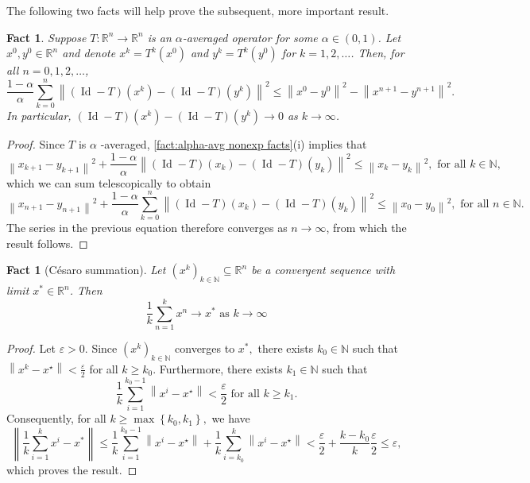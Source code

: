 \documentclass[smallextended,numbook,nospthms]{svjour3}
\theoremstyle{plain}
\newtheorem{fact}[theorem]{Fact}
\theoremstyle{definition}
\def\RR{\mathds R}
\def\NN{\mathds N}
\DeclareMathOperator{\Id}{Id}
\begin{document}
The following two facts will help prove the subsequent, more important result.
\begin{fact}\label{fact:alpha-avg lemma}
Suppose $T: \RR^n \rightarrow \RR^n$ is an $\alpha$-averaged operator for some $\alpha \in (0,1)$. Let $x^{0}, y^{0} \in \RR^n$ and denote $x^{k}=T^{k}\left(x^{0}\right)$ and $y^{k}=T^{k}\left(y^{0}\right)$ for $k=1,2, \ldots$. Then, for all $n=0,1,2, \ldots$, 
$$
\frac{1-\alpha}{\alpha} \sum_{k=0}^{n}\left\|(\operatorname{Id}-T)\left(x^{k}\right)-(\operatorname{Id}-T)\left(y^{k}\right)\right\|^{2} \leq\left\|x^{0}-y^{0}\right\|^{2}-\left\|x^{n+1}-y^{n+1}\right\|^{2}. 
$$
In particular, $(\Id-T)\left(x^{k}\right)-(\Id-T)\left(y^{k}\right) \rightarrow 0$ as $k \rightarrow \infty$.
\end{fact}
\begin{proof}
Since $T$ is $\alpha$ -averaged, \cref{fact:alpha-avg nonexp facts}(i) implies that
$$
\left\|x_{k+1}-y_{k+1}\right\|^{2}+\frac{1-\alpha}{\alpha}\left\|(\operatorname{Id}-T)\left(x_{k}\right)-(\Id-T)\left(y_{k}\right)\right\|^{2} \leq\left\|x_{k}-y_{k}\right\|^{2}, \text{ for all } k \in \NN,
$$
which we can sum telescopically to obtain
$$
\left\|x_{n+1}-y_{n+1}\right\|^{2}+\frac{1-\alpha}{\alpha} \sum_{k=0}^{n}\left\|(\operatorname{Id}-T)\left(x_{k}\right)-(\operatorname{Id}-T)\left(y_{k}\right)\right\|^{2} \leq\left\|x_{0}-y_{0}\right\|^{2}, \text{ for all } n \in \NN.
$$
The series in the previous equation therefore converges as $n \rightarrow \infty$, from which the result follows.
\end{proof}

\begin{fact}[Césaro summation]\label{fact:cesaro sum}
	Let $\left(x^{k}\right)_{k \in \NN} \subseteq \RR^n$ be a convergent sequence with limit $x^{*} \in \RR^n$. Then
	$$
	\frac{1}{k} \sum_{n=1}^{k} x^{n} \rightarrow x^* \text { as } k \rightarrow \infty
	$$
\end{fact}
\begin{proof}
	Let $\varepsilon>0$. Since $\left(x^{k}\right)_{k \in \NN}$ converges to $x^{*},$ there exists $k_{0} \in \NN$ such that $\left\|x^{k}-x^{\star}\right\|<\frac{\varepsilon}{2}$ for all $k \geq k_{0}$. Furthermore, there exists $k_{1} \in \NN$ such that
	$$
	\frac{1}{k} \sum_{i=1}^{k_{0}-1}\left\|x^{i}-x^{\star}\right\|<\frac{\varepsilon}{2} \text { for all } k \geq k_{1}.
	$$
	Consequently, for all $k \geq \max \left\{k_{0}, k_{1}\right\},$ we have
	$$
	\left\|\frac{1}{k} \sum_{i=1}^{k} x^{i}-x^{*}\right\| \leq \frac{1}{k} \sum_{i=1}^{k_{0}-1}\left\|x^{i}-x^{\star}\right\|+\frac{1}{k} \sum_{i=k_{0}}^{k}\left\|x^{i}-x^{\star}\right\|<\frac{\varepsilon}{2}+\frac{k-k_{0}}{k} \frac{\varepsilon}{2} \leq \varepsilon,
	$$
	which proves the result.
\end{proof}
\end{document}

